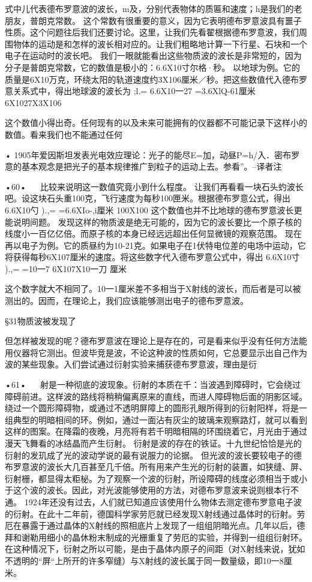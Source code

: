 式中儿代表德布罗意波的波长，m及，分别代表物体的质匾和速度；h是我们的老朋友，普朗克常数。
这个常数有很重要的意义，因为它表明德布罗意波具有噩子性质。这个问题往后我们还要讨论。这里，让我们先看翟根据德布罗意波，我们周围物体的运动是和怎样的波长相对应的。让我们粗略地计算一下行星、石块和一个电子在运动时的波长吧。
我们一眼就能看出这些物质波的波长是非常短的，因为分子是普朗克常数，它的数值是极小的：6.6X10寸尔格·秒。
以地球为例。它的质量是6X10万克，环绕太阳的轨道速度约3X106厘米／秒。把这些数值代入德布罗意关系式中，得出地球波的波长为
;l.=
6.6X10一27
=3.6XlQ-61厘米6X1027X3X106

这个数值小得出奇。任何现有的以及未来可能拥有的仪器都不可能记录下这样小的数值。看来我们也不能通过任何

•	1905年爱因斯坦发表光电效应理论：光子的能尽E=加，动昼P=h/入．密布罗意的基本观念是把光子的基本规律推广到粒子的运动上去。参看”。--译者注

•60•
  
比较来说明这一数值究竟小到什么程度。
让我们再看看一块石头虳波长吧。设这块石头重100克，飞行速度为每秒100匣米。根据德布罗意公式，得出
6.6X10勺
	).,=	=6.6XIo-,i厘米
100X100
这个数值也并不比地球的德布罗意波长更能说明间题。
发现这样的物质波是绝无可能的，因为它的波长要比一个原子核的线度小一百亿亿倍。而原子核的本身已经远远超出任何显微镜的观察范围。
现在再以电子为例。它的质昼约为10-21克。如果电子在1伏特电位差的电场中运动，它将获得每秒6X107厘米的速度。将这些数字代入德布罗意公式中，得出
6.6X10寸
	).,=	=10一7
6X107X10一刀
厘米

这个数字就大不相同了。10一1厘米差不多相当于X射线的波长，而后者是可以被测出的。因而，在理论上，我们应该能够测出电子的德布罗意波。

§31物质波被发现了

但怎样被发现的呢？德布罗意波在理论上是存在的，可是看来似乎没有任何方法能用仪器将它测出。但波毕竞是波，不论这种波的性质如何，它总要显示出自己作为波的某些现象。入们尝试通过衍射实验来捕获德布罗意波，理由是衍

•61•
  
射是一种彻底的波现象。衍射的本质在千：当波遇到障碍时，它会绕过障碍前进。这样波的路线将稍稍偏离原来的直线，而进人障碍物后面的阴影区域。
绕过一个圆形障碍物，或通过不透明屏障上的圆形孔眼所得到的衍射阳样，将是一组典型的明暗相间的环。例如，通过一面沾有灰尘的玻璃来观察路灯，就可以看到这样的图案。在降霜的夜晚，月亮将有若千明暗相隔的环围绕着它，月光由于通过漫天飞舞看的冰结晶而产生衍射。
衍射是波的存在的铁证。十九世纪恰恰是光的衍射的发玑成了光的波动学说的最有说服力的论据。
但光波的波长要较电子的德布罗意波的波长大几百甚至几千倍。所有用来产生光的衍射的装置，如狭缝、屏、衍射栅，都显得太粔柲。为了观察一个波的衍射，所设障碍的线度必须相当于或小于这个波的波长。因此，对光波能够使用的方法，对德布罗意波来说则根本行不通。
1924年还没有过去，人们就已知道应该使用什么物体去测定德布罗意电子波的衍射。在此十二年前，德国科学家劳厄就已经发现X射线通过晶体时的衍射。劳厄在暴露于通过晶体的X射线的照相底片上发现了一组组阴暗光点。几年以后，德拜和谢勒用细小的晶休粉末制成的光栅重复了劳厄的实验，并得到一组组衍射环。在这种情况下，衍射之所以可能，是由于晶体内原子的间距（对X射线来说，犹如不透明的“屏“上所开的许多窄缝）与X射线的波长属于同一数量级，即10一8厘米。

